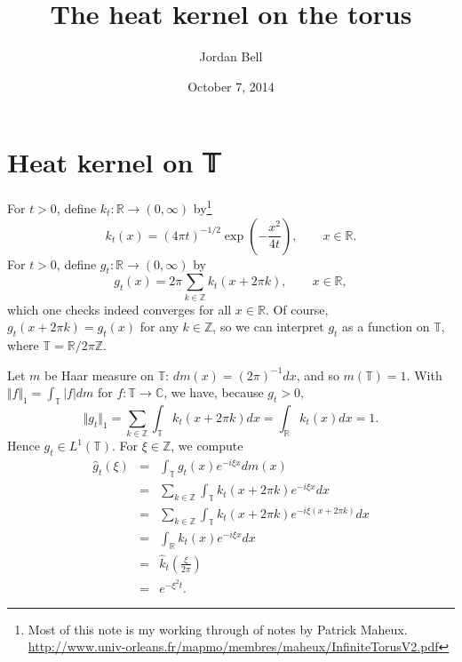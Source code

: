 \documentclass{article}
\newcommand{\norm}[1]{\Vert #1 \Vert}
\begin{document}
\title{The heat kernel on the torus}
\author{Jordan Bell}
\date{October 7, 2014}
\maketitle

\section{Heat kernel on 𝕋}
For $t>0$, define $k_t:\mathbb{R} \to (0,\infty)$ by\footnote{Most of this note is my working through of notes by Patrick Maheux. \url{http://www.univ-orleans.fr/mapmo/membres/maheux/InfiniteTorusV2.pdf}}
\[
k_t(x) = (4\pi t)^{-1/2} \exp \left( - \frac{x^2}{4t} \right), \qquad x \in \mathbb{R}.
\]
For $t>0$, define $g_t:\mathbb{R} \to (0,\infty)$ by
\[
g_t(x) = 2\pi \sum_{k \in \mathbb{Z}} k_t(x+2\pi k), \qquad x \in \mathbb{R},
\]
which one checks indeed converges for all $x \in \mathbb{R}$. Of course, $g_t(x+2\pi k)=g_t(x)$ for any $k \in \mathbb{Z}$, 
so we can interpret $g_t$ as a function on $\mathbb{T}$, where $\mathbb{T} = \mathbb{R}/2\pi\mathbb{Z}$. 

Let $m$ be Haar measure on $\mathbb{T}$: $dm(x)=(2\pi)^{-1} dx$, and so $m(\mathbb{T})=1$.
With $\norm{f}_1 = \int_{\mathbb{T}} |f| dm$ for $f:\mathbb{T} \to \mathbb{C}$, we have, because $g_t>0$,
\[
\norm{g_t}_1=\sum_{k \in \mathbb{Z}} \int_{\mathbb{T}} k_t(x+2\pi k) dx=\int_{\mathbb{R}} k_t(x) dx = 1.
\]
Hence $g_t \in L^1(\mathbb{T})$. For $\xi \in \mathbb{Z}$, we compute
\begin{eqnarray*}
\hat{g}_t(\xi)&=&\int_{\mathbb{T}} g_t(x) e^{-i\xi x} dm(x)\\
&=&\sum_{k \in \mathbb{Z}} \int_{\mathbb{T}} k_t(x+2\pi k) e^{-i\xi  x} dx\\
&=&\sum_{k \in \mathbb{Z}} \int_{\mathbb{T}} k_t(x+2\pi k) e^{-i\xi  (x+2\pi k)} dx\\
&=&\int_{\mathbb{R}} k_t(x) e^{-i\xi x} dx\\
&=&\hat{k}_t\left(\frac{\xi}{2\pi} \right)\\
&=&e^{-\xi^2 t}.
\end{eqnarray*}
\end{document}
